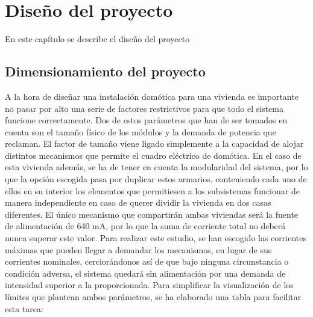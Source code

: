 \chapter{Diseño del proyecto}

En este capítulo se describe el diseño del proyecto

\section{Dimensionamiento del proyecto}

A la hora de diseñar una instalación domótica para una vivienda es importante no pasar por alto una serie de factores restrictivos para que todo el sistema funcione correctamente. Dos de estos parámetros que han de ser tomados en cuenta son el tamaño físico de los módulos y la demanda de potencia que reclaman. El factor de tamaño viene ligado simplemente a la capacidad de alojar distintos mecanismos que permite el cuadro eléctrico de domótica. En el caso de esta vivienda además, se ha de tener en cuenta la modularidad del sistema, por lo que la opción escogida pasa por duplicar estos armarios, conteniendo cada uno de ellos en su interior los elementos que permitiesen a los subsistemas funcionar de manera independiente en caso de querer dividir la vivienda en dos casas diferentes. El único mecanismo que compartirán ambas viviendas será la fuente de alimentación de 640 mA, por lo que la suma de corriente total no deberá nunca superar este valor. Para realizar este estudio, se han escogido las corrientes máximas que pueden llegar a demandar los mecanismos, en lugar de sus corrientes nominales, cerciorándonos así de que bajo ninguna circunstancia o condición adversa, el sistema quedará sin alimentación por una demanda de intensidad superior a la proporcionada. Para simplificar la visualización de los límites que plantean ambos parámetros, se ha elaborado una tabla para facilitar esta tarea:

